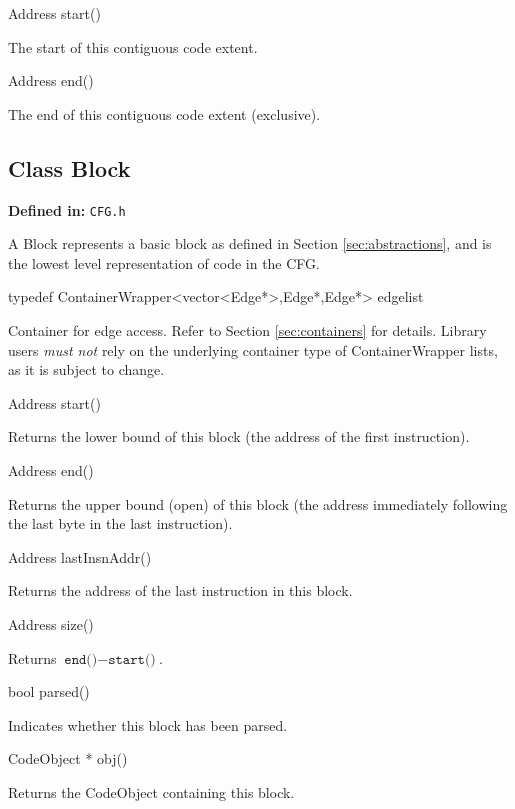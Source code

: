 \documentclass{article}
\newenvironment{apient}{\small\verbatim}{\endverbatim}
\newcommand{\apidesc}[1]{%
{\addtolength{\leftskip}{4em}%
#1\par\medskip}
}
\newcommand{\definedin}[1]{%
\textbf{Defined in:} \texttt{#1}
}
\begin{document}
\begin{apient}
Address start()
\end{apient}
\apidesc{The start of this contiguous code extent.}

\begin{apient}
Address end()
\end{apient}
\apidesc{The end of this contiguous code extent (exclusive).}

\subsection{Class Block}

\definedin{CFG.h}

A Block represents a basic block as defined in Section \ref{sec:abstractions}, and is the lowest level representation of code in the CFG.

\begin{apient}
typedef ContainerWrapper<vector<Edge*>,Edge*,Edge*> edgelist
\end{apient}
\apidesc{Container for edge access. Refer to Section \ref{sec:containers} for details. Library users \emph{must not} rely on the underlying container type of ContainerWrapper lists, as it is subject to change.}


\begin{apient}
Address start()
\end{apient}
\apidesc{Returns the lower bound of this block (the address of the first instruction).}

\begin{apient}
Address end()
\end{apient}
\apidesc{Returns the upper bound (open) of this block (the address immediately
following the last byte in the last instruction). }

\begin{apient}
Address lastInsnAddr()
\end{apient}
\apidesc{Returns the address of the last instruction in this block.}

\begin{apient}
Address size()
\end{apient}
\apidesc{Returns $\texttt{end()} - \texttt{start()}$.}

\begin{apient}
bool parsed()
\end{apient}
\apidesc{Indicates whether this block has been parsed.}

\begin{apient}
CodeObject * obj()
\end{apient}
\apidesc{Returns the CodeObject containing this block.}
\end{document}
